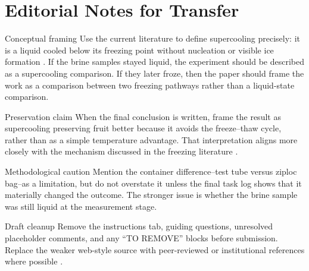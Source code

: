 
\newcommand{\contributor}[1]{\vspace{4pt}\noindent\textcolor{gray}{\small\textit{[Contributor: #1]}}\vspace{2pt}}



\section*{Editorial Notes for Transfer}

\begin{editorialnote}{Conceptual framing}
Use the current literature to define supercooling precisely: it is a liquid cooled below its freezing point without nucleation or visible ice formation \cite{lin2023,kang2020}. If the brine samples stayed liquid, the experiment should be described as a supercooling comparison. If they later froze, then the paper should frame the work as a comparison between two freezing pathways rather than a liquid-state comparison.
\end{editorialnote}

\begin{editorialnote}{Preservation claim}
When the final conclusion is written, frame the result as supercooling preserving fruit better because it avoids the freeze--thaw cycle, rather than as a simple temperature advantage. That interpretation aligns more closely with the mechanism discussed in the freezing literature \cite{narayana2023}.
\end{editorialnote}

\begin{editorialnote}{Methodological caution}
Mention the container difference--test tube versus ziploc bag--as a limitation, but do not overstate it unless the final task log shows that it materially changed the outcome. The stronger issue is whether the brine sample was still liquid at the measurement stage.
\end{editorialnote}

\begin{editorialnote}{Draft cleanup}
Remove the instructions tab, guiding questions, unresolved placeholder comments, and any ``TO REMOVE'' blocks before submission. Replace the weaker web-style source with peer-reviewed or institutional references where possible \cite{lin2023,kang2020,fao1989}.
\end{editorialnote}

